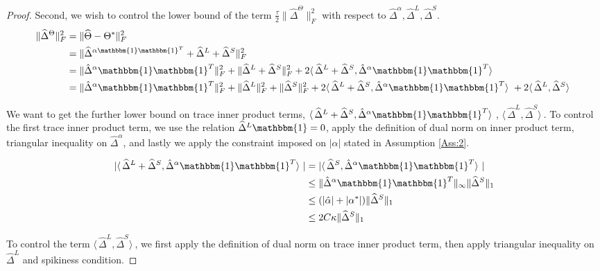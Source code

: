 \documentclass[AMS,STIX1COL]{WileyNJD-v2}
\begin{document}
\begin{proof}
Second, we wish to control the lower bound of the term  $\frac{\tau}{2}\|\hat{\Delta}^{\Theta}\|_{F}^{2}$ with respect to $\hat{\Delta}^{\alpha},\hat{\Delta}^{L},\hat{\Delta}^{S}$.
\begin{align}
\|\widehat{\Delta}^{\Theta}\|_{F}^{2}  \nonumber
&= \|\widehat{\Theta}-\Theta^{*} \|_{F}^{2} \\ \nonumber
&= \|\widehat\Delta^{\alpha\mathbbm{1}\mathbbm{1}^T} + \widehat\Delta^{L} + \widehat\Delta^{S}\|_{F}^{2} \\ \nonumber
&= \|\hat{\Delta}^{\alpha}\mathbbm{1}\mathbbm{1}^T\|_{F}^{2} + \|\widehat{\Delta}^{L}+\widehat{\Delta}^{S}\|_{F}^{2} + 
2 \langle\, \widehat\Delta^{L} + \widehat\Delta^{S} ,\hat{\Delta}^{\alpha}\mathbbm{1}\mathbbm{1}^T \rangle\ \\ 
&=  \|\hat{\Delta}^{\alpha}\mathbbm{1}\mathbbm{1}^T\|_{F}^{2} + \|\widehat{\Delta}^{L}\|_{F}^{2} + \|\widehat{\Delta}^{S}\|_{F}^{2} + 
2 \langle\, \widehat\Delta^{L} + \widehat\Delta^{S} ,\hat{\Delta}^{\alpha}\mathbbm{1}\mathbbm{1}^T \rangle\ +
2 \langle\, \widehat\Delta^{L}, \widehat\Delta^{S} \rangle\  \label{eq:12}
\end{align}

We want to get the further lower bound on trace inner product terms, 
$ \langle\, \widehat\Delta^{L} + \widehat\Delta^{S} ,\hat{\Delta}^{\alpha}\mathbbm{1}\mathbbm{1}^T \rangle\ $, $ \langle\, \widehat\Delta^{L}, \widehat\Delta^{S} \rangle\ $. To control the first trace inner product term, we use the relation $\widehat{\Delta}^{L}\mathbbm{1}=0$, apply the definition of dual norm on inner product term, triangular inequality on $\hat{\Delta}^\alpha$, and lastly we apply the constraint imposed on $|\alpha|$ stated in Assumption \ref{Ass:2}.

\begin{align}
    | \langle\, \widehat\Delta^{L} + \widehat\Delta^{S} ,\hat{\Delta}^{\alpha}\mathbbm{1}\mathbbm{1}^T\rangle\ | \nonumber
    &= | \langle\,\widehat\Delta^{S},\hat{\Delta}^{\alpha}\mathbbm{1}\mathbbm{1}^T\rangle\ | \\ \nonumber
    &\leq \|\hat{\Delta}^{\alpha}\mathbbm{1}\mathbbm{1}^T \|_{\infty} \|\widehat{\Delta}^{S}\|_1 \\ \nonumber
    &\leq (|\hat{\alpha}|+|\alpha^{*}|)\|\widehat{\Delta}^{S}\|_1\\ 
    &\leq 2C\kappa\|\widehat{\Delta}^{S}\|_1  \label{eq:13}
\end{align}

To control the term $ \langle\, \widehat\Delta^{L}, \widehat\Delta^{S} \rangle\ $, we first apply the definition of dual norm on trace inner product term, then apply triangular inequality on $\widehat{\Delta}^{L}$ and spikiness condition. 


\end{proof}
\end{document}
